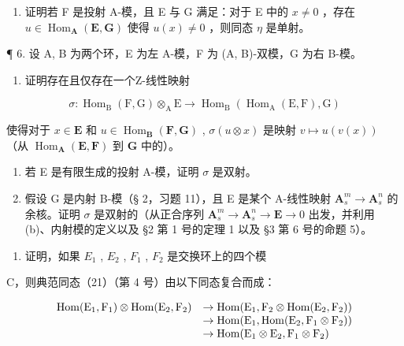 \begin{enumerate}
\def\labelenumi{(\alph{enumi})}
\setcounter{enumi}{1}
\tightlist
\item
  证明若 F 是投射 A-模，且 E 与 G 满足：对于 E 中的 \(x \neq 0\) ，存在 \(u \in \operatorname{Hom}_{\mathbf{A}}(\mathbf{E}, \mathbf{G})\) 使得 \(u(x) \neq 0\) ，则同态 \(\eta\) 是单射。
\end{enumerate}

¶ 6. 设 A, B 为两个环，E 为左 A-模，F 为 (A, B)-双模，G 为右 B-模。

\begin{enumerate}
\def\labelenumi{(\alph{enumi})}
\tightlist
\item
  证明存在且仅存在一个Z-线性映射
\end{enumerate}

\[
\sigma : \operatorname{Hom} _ {\mathrm{B}} (\mathrm{F}, \mathrm{G}) \otimes_ {\mathrm{A}} \mathrm{E} \rightarrow \operatorname{Hom} _ {\mathrm{B}} (\operatorname{Hom} _ {\mathrm{A}} (\mathrm{E}, \mathrm{F}), \mathrm{G})
\]

使得对于 \(x \in \mathbf{E}\) 和 \(u \in \operatorname{Hom}_{\mathbf{B}}(\mathbf{F}, \mathbf{G})\) , \(\sigma(u \otimes x)\) 是映射 \(v \mapsto u(v(x))\) （从 \(\operatorname{Hom}_{\mathbf{A}}(\mathbf{E}, \mathbf{F})\) 到 \(\mathbf{G}\) 中的）。

\begin{enumerate}
\def\labelenumi{(\alph{enumi})}
\setcounter{enumi}{1}
\item
  若 E 是有限生成的投射 A-模，证明 \(\sigma\) 是双射。
\item
  假设 G 是内射 B-模（§ 2，习题 11），且 E 是某个 A-线性映射 \(\mathbf{A}_s^m \to \mathbf{A}_s^n\) 的余核。证明 \(\sigma\) 是双射的（从正合序列 \(\mathbf{A}_s^m \to \mathbf{A}_s^n \to \mathbf{E} \to 0\) 出发，并利用 (b)、内射模的定义以及 §2 第 1 号的定理 1 以及 §3 第 6 号的命题 5）。
\end{enumerate}

\begin{enumerate}
\def\labelenumi{\arabic{enumi}.}
\setcounter{enumi}{6}
\tightlist
\item
  证明，如果 \(E_{1}\) , \(E_{2}\) , \(F_{1}\) , \(F_{2}\) 是交换环上的四个模
\end{enumerate}

C，则典范同态（21）（第 4 号）由以下同态复合而成：

\[
\begin{array}{r l} \operatorname{Hom} (\mathrm{E} _ {1}, \mathrm{F} _ {1}) \otimes \operatorname{Hom} (\mathrm{E} _ {2}, \mathrm{F} _ {2}) & \to \operatorname{Hom} (\mathrm{E} _ {1}, \mathrm{F} _ {2} \otimes \operatorname{Hom} (\mathrm{E} _ {2}, \mathrm{F} _ {2})) \\ & \to \operatorname{Hom} (\mathrm{E} _ {1}, \operatorname{Hom} (\mathrm{E} _ {2}, \mathrm{F} _ {1} \otimes \mathrm{F} _ {2})) \\ & \to \operatorname{Hom} (\mathrm{E} _ {1} \otimes \mathrm{E} _ {2}, \mathrm{F} _ {1} \otimes \mathrm{F} _ {2}) \end{array}
\]

